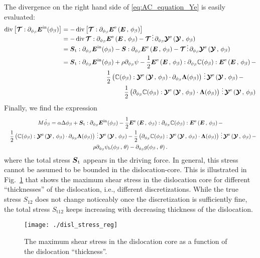 \documentclass[preprint,review,3p,times,authoryear]{elsarticle}
\begin{document}
The divergence on the right hand side of \eqref{eq:AC_equation_Ye} is easily evaluated:
\begin{align*}
  \diver{\left[\ttT:\pder{\tEtr}{\phi_{\beta}}\right]}
  &= -\diver{\left[\ttT:\pder{\tEe}{\phi_{\beta}}\right]}\\
  &= -\diver{\ttT}:\pder{\tEe}{\phi_{\beta}} - \ttT\tridot \pder{\ttYe}{\phi_{\beta}}\\
  &= \tSt:\pder{\tEtr}{\phi_{\beta}} -\tS:\pder{\tEe}{\phi_{\beta}} - \ttT\tridot \pder{\ttYe}{\phi_{\beta}}\\
  &= \tSt:\pder{\tEtr}{\phi_{\beta}} + \rho\pder{\psi}{\phi_{\beta}} - \half\tEe:\pder{\bbC(\phi_{\beta})}{\phi_{\beta}}:\tEe - \\
  & \hspace{2.5cm} \half\left( \bbC(\phi_{\beta}):\ttYe\cdot\pder{\tLcore}{\phi_{\beta}} \right)\tridot \ttYe -\\
  & \hspace{3.5cm} \half\left( \pder{\bbC(\phi_{\beta})}{\phi_{\beta}}:\ttYe\cdot\tLcore \right) \tridot \ttYe
\end{align*}
Finally, we find the expression
\begin{multline}
  \label{eq:AC_equation}
  M\sdot\phi_{\beta} = \alpha\Delta\phi_{\beta} + \tSt:\pder{\tEtr}{\phi_{\beta}} - \half\tEe:\pder{\bbC(\phi_{\beta})}{\phi_{\beta}}:\tEe -\\ \quad \half\left( \bbC(\phi_{\beta}):\ttYe\cdot\pder{\tLcore}{\phi_{\beta}} \right)\tridot \ttYe - \half\left( \pder{\bbC(\phi_{\beta})}{\phi_{\beta}}:\ttYe\cdot\tLcore \right) \tridot \ttYe -\\ \rho\pder{\psi_{\ub}(\phi_{\beta}\,,\,\theta)}{\phi_{\beta}} - \pder{g(\phi_{\beta}\,,\,\theta)}{\phi_{\beta}}\,.
\end{multline}
where the total stress $\boldsymbol{S}_{\text{t}}$ appears in the driving force. In general, this stress cannot be assumed to be bounded in the dislocation-core. This is illustrated in Fig.~\ref{fig:disl_reg} that shows the maximum shear stress in the dislocation core for different ``thicknesses'' of the dislocation, i.e., different discretizations. While the true stress $S_{12}$ does not change noticeably once the discretization is sufficiently fine, the total stress $S_{\text{t}12}$ keeps increasing with decreasing thickness of the dislocation.
\begin{figure}[tbp]
  \texttt{[image: ./disl\_stress\_reg]}
  \caption{The maximum shear stress in the dislocation core as a function of the dislocation ``thickness''.}
  \label{fig:disl_reg}
\end{figure}





\end{document}
